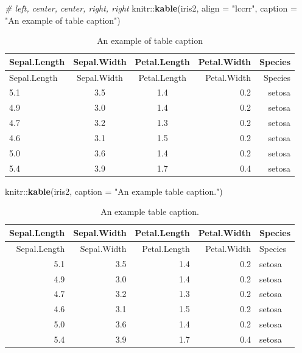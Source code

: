 \documentclass[]{tufte-handout}
\newenvironment{Shaded}{}{}
\newcommand{\CommentTok}[1]{\textcolor[rgb]{0.38,0.63,0.69}{\textit{#1}}}
\newcommand{\DataTypeTok}[1]{\textcolor[rgb]{0.56,0.13,0.00}{#1}}
\newcommand{\DecValTok}[1]{\textcolor[rgb]{0.25,0.63,0.44}{#1}}
\newcommand{\KeywordTok}[1]{\textcolor[rgb]{0.00,0.44,0.13}{\textbf{#1}}}
\newcommand{\NormalTok}[1]{#1}
\newcommand{\OperatorTok}[1]{\textcolor[rgb]{0.40,0.40,0.40}{#1}}
\newcommand{\StringTok}[1]{\textcolor[rgb]{0.25,0.44,0.63}{#1}}
\begin{document}
\begin{Shaded}
\begin{Highlighting}[]
\CommentTok{# left, center, center, right, right}
\NormalTok{knitr}\OperatorTok{::}\KeywordTok{kable}\NormalTok{(iris2, }\DataTypeTok{align =} \StringTok{"lccrr"}\NormalTok{, }\DataTypeTok{caption =} \StringTok{"An example of table caption"}\NormalTok{)}
\end{Highlighting}
\end{Shaded}

\begin{longtable}[]{@{}lccrr@{}}
\caption{An example of table caption}\tabularnewline
\toprule
Sepal.Length & Sepal.Width & Petal.Length & Petal.Width &
Species\tabularnewline
\midrule
\endfirsthead
\toprule
Sepal.Length & Sepal.Width & Petal.Length & Petal.Width &
Species\tabularnewline
\midrule
\endhead
5.1 & 3.5 & 1.4 & 0.2 & setosa\tabularnewline
4.9 & 3.0 & 1.4 & 0.2 & setosa\tabularnewline
4.7 & 3.2 & 1.3 & 0.2 & setosa\tabularnewline
4.6 & 3.1 & 1.5 & 0.2 & setosa\tabularnewline
5.0 & 3.6 & 1.4 & 0.2 & setosa\tabularnewline
5.4 & 3.9 & 1.7 & 0.4 & setosa\tabularnewline
\bottomrule
\end{longtable}

\begin{Shaded}
\begin{Highlighting}[]
\NormalTok{knitr}\OperatorTok{::}\KeywordTok{kable}\NormalTok{(iris2, }\DataTypeTok{caption =} \StringTok{"An example table caption."}\NormalTok{)}
\end{Highlighting}
\end{Shaded}

\begin{longtable}[]{@{}rrrrl@{}}
\caption{An example table caption.}\tabularnewline
\toprule
Sepal.Length & Sepal.Width & Petal.Length & Petal.Width &
Species\tabularnewline
\midrule
\endfirsthead
\toprule
Sepal.Length & Sepal.Width & Petal.Length & Petal.Width &
Species\tabularnewline
\midrule
\endhead
5.1 & 3.5 & 1.4 & 0.2 & setosa\tabularnewline
4.9 & 3.0 & 1.4 & 0.2 & setosa\tabularnewline
4.7 & 3.2 & 1.3 & 0.2 & setosa\tabularnewline
4.6 & 3.1 & 1.5 & 0.2 & setosa\tabularnewline
5.0 & 3.6 & 1.4 & 0.2 & setosa\tabularnewline
5.4 & 3.9 & 1.7 & 0.4 & setosa\tabularnewline
\bottomrule
\end{longtable}

\begin{Shaded}
\end{Shaded}
\end{document}
